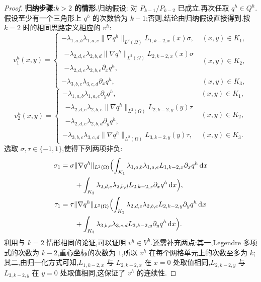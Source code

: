 \begin{proof}
\textbf{归纳步骤:$k>2$ 的情形.}归纳假设: 对 $P_{k-1}/P_{k-2}$ 已成立.再次任取 $q^h\in Q^h$.假设至少有一个三角形上 $q^h$ 的次数恰为 $k-1$;否则,结论由归纳假设直接得到.按 $k=2$ 时的相同思路定义相应的 $v^h$:
\[
v_1^h(x,y)=
\begin{cases}
 -\lambda_{1,a,b}\lambda_{1,a,e}\|\nabla q^h\|_{L^2(\Omega)}L_{1,k-2,x}(x)\sigma,&(x,y)\in K_1,\\
 \begin{aligned}
  -\lambda_{2,d,e}\lambda_{2,b,d}\|\nabla q^h\|_{L^2(\Omega)}L_{2,k-2,x}(x)\sigma\\[-.25em]
  -\lambda_{2,d,e}\lambda_{2,b,e}\partial_xq^h,
 \end{aligned}&(x,y)\in K_2,\\
 -\lambda_{3,b,c}\lambda_{3,c,d}\partial_xq^h,&(x,y)\in K_3,
\end{cases}
\]
\[
v_2^h(x,y)=
\begin{cases}
 -\lambda_{1,a,b}\lambda_{1,a,e}\partial_yq^h,&(x,y)\in K_1,\\
 \begin{aligned}
  -\lambda_{2,d,e}\lambda_{2,b,e}\|\nabla q^h\|_{L^2(\Omega)}L_{2,k-2,y}(y)\tau\\[-.25em]
  -\lambda_{2,d,e}\lambda_{2,b,d}\partial_yq^h,
 \end{aligned}&(x,y)\in K_2,\\
 -\lambda_{3,b,c}\lambda_{3,c,d}\|\nabla q^h\|_{L^2(\Omega)}L_{3,k-2,y}(y)\tau,&(x,y)\in K_3.
\end{cases}
\]
选取 $\sigma,\tau\in\{-1,1\}$,使得下列两项非负:
\[
\begin{aligned}
  \sigma_1&=\sigma\|\nabla q^h\|_{L^2(\Omega)}\Bigl(
       \int_{K_1}\lambda_{1,a,b}\lambda_{1,a,e}L_{1,k-2,x}\partial_xq^h\,\mathrm{d}x\\
       &\qquad+\int_{K_2}\lambda_{2,d,e}\lambda_{2,b,d}L_{2,k-2,x}\partial_xq^h\,\mathrm{d}x\Bigr),\\
  \tau_1&=\tau\|\nabla q^h\|_{L^2(\Omega)}\Bigl(
       \int_{K_2}\lambda_{2,d,e}\lambda_{2,b,e}L_{2,k-2,y}\partial_yq^h\,\mathrm{d}x\\
       &\qquad+\int_{K_3}\lambda_{3,b,c}\lambda_{3,c,d}L_{3,k-2,y}\partial_yq^h\,\mathrm{d}x\Bigr).
\end{aligned}
\]
利用与 $k=2$ 情形相同的论证,可以证明 $v^h\in V^h$.还需补充两点:其一,Legendre 多项式的次数为 $k-2$,重心坐标的次数为 $1$,所以 $v^h$ 在每个网格单元上的次数至多为 $k$;其二,由归一化方式可知,$L_{1,k-2,x}$ 与 $L_{2,k-2,x}$ 在 $x=0$ 处取值相同,$L_{2,k-2,y}$ 与 $L_{3,k-2,y}$ 在 $y=0$ 处取值相同,这保证了 $v^h$ 的连续性.


\end{proof}
